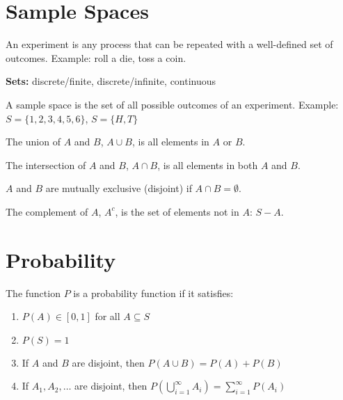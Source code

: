 \section{Sample Spaces}

\begin{definition}
An experiment is any process that can be repeated with a well-defined set of outcomes. Example: roll a die, toss a coin.
\end{definition}

\textbf{Sets:} discrete/finite, discrete/infinite, continuous

\begin{definition}
A sample space is the set of all possible outcomes of an experiment. Example: $S = \{1, 2, 3, 4, 5, 6\}$, $S = \{H, T\}$
\end{definition}

\begin{definition}
The union of $A$ and $B$, $A \cup B$, is all elements in $A$ or $B$.
\end{definition}

\begin{definition}
The intersection of $A$ and $B$, $A \cap B$, is all elements in both $A$ and $B$.
\end{definition}

\begin{definition}
$A$ and $B$ are mutually exclusive (disjoint) if $A \cap B = \emptyset$.
\end{definition}

\begin{definition}
The complement of $A$, $A^c$, is the set of elements not in $A$: $S - A$.
\end{definition}

\section{Probability}

\begin{definition}
The function $P$ is a probability function if it satisfies:
\begin{enumerate}
\item $P(A) \in [0, 1]$ for all $A \subseteq S$
\item $P(S) = 1$
\item If $A$ and $B$ are disjoint, then $P(A \cup B) = P(A) + P(B)$
\item If $A_1, A_2, \ldots$ are disjoint, then $P\left(\bigcup_{i=1}^{\infty} A_i\right) = \sum_{i=1}^{\infty} P(A_i)$
\end{enumerate}
\end{definition}

